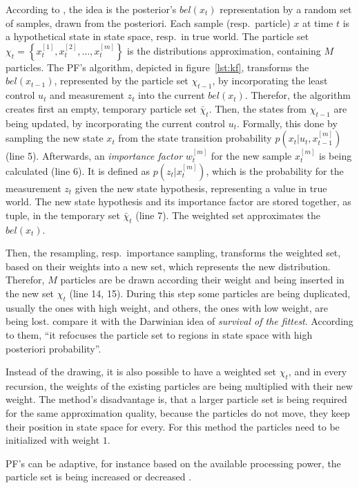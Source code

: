According to \citet{thrun:prob_robo}, the idea is the posterior's $bel(x_t)$ representation by a random set of samples, drawn from the posteriori. Each sample (resp.\ particle) $x$ at time $t$ is a hypothetical state in state space, resp.\ in true world. The particle set $\chi_t = \left\{ x^{[1]}_t, x^{[2]}_t, \ldots, x^{[m]}_t \right\}$ is the distributions approximation, containing $M$ particles. The \acs{PF}'s algorithm, depicted in figure~\ref{lst:kf}, transforms the $bel(x_{t-1})$, represented by the particle set $\chi_{t-1}$, by incorporating the least control $u_t$ and measurement $z_t$ into the current $bel(x_t)$. Therefor, the algorithm creates first an empty, temporary particle set $\bar{\chi}_t$. Then, the states from $\chi_{t-1}$ are being updated, by incorporating the current control $u_t$. Formally, this done by sampling the new state $x_t$ from the state transition probability $p(x_t|u_t, x^{[m]}_{t-1})$ (line 5). Afterwards, an \emph{importance factor} $w^{[m]}_t$ for the new sample $x^{[m]}_t$ is being calculated (line 6). It is defined as $p(z_t|x^{[m]}_t)$, which is the probability for the measurement $z_t$ given the new state hypothesis, representing a value in true world. The new state hypothesis and its importance factor are stored together, as tuple, in the temporary set $\bar{\chi}_t$ (line 7). The weighted set approximates the $bel(x_t)$.

 Then, the resampling, resp.\ importance sampling, transforms the weighted set, based on their weights into a new set, which represents the new distribution. Therefor, $M$ particles are be drawn according their weight and being inserted in the new set $\chi_t$ (line 14, 15). During this step some particles are being duplicated, usually the ones with high weight, and others, the ones with low weight, are being lost. \citet{thrun:prob_robo} compare it with the Darwinian idea of \emph{survival of the fittest}. According to them, ``it refocuses the particle set to regions in state space with high posteriori probability''.
 
 Instead of the drawing, it is also possible to have a weighted set $\chi_t$, and in every recursion, the weights of the existing particles are being multiplied with their new weight. The method's disadvantage is, that a larger particle set is being required for the same approximation quality, because the particles do not move, they keep their position in state space for every. For this method the particles need to be initialized with weight $1$.
 
\acs{PF}'s can be adaptive, for instance based on the available processing power, the particle set is being increased or decreased \citep{thrun:prob_robo}.

